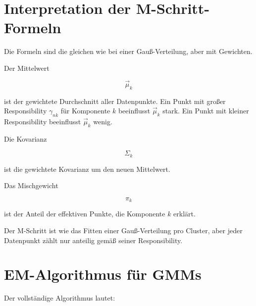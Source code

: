 \section{Interpretation der M-Schritt-Formeln}

Die Formeln sind die gleichen wie bei einer Gauß-Verteilung, aber mit Gewichten.

Der Mittelwert

\[
    \vec{\mu}_k
\]

ist der gewichtete Durchschnitt aller Datenpunkte.
Ein Punkt mit großer Responsibility \(\gamma_{nk}\) für Komponente \(k\) beeinflusst \(\vec{\mu}_k\) stark.
Ein Punkt mit kleiner Responsibility beeinflusst \(\vec{\mu}_k\) wenig.

Die Kovarianz

\[
    \Sigma_k
\]

ist die gewichtete Kovarianz um den neuen Mittelwert.

Das Mischgewicht

\[
    \pi_k
\]

ist der Anteil der effektiven Punkte, die Komponente \(k\) erklärt.

\begin{conceptbox}
Der M-Schritt ist wie das Fitten einer Gauß-Verteilung pro Cluster, aber jeder Datenpunkt zählt nur anteilig gemäß seiner Responsibility.
\end{conceptbox}

\section{EM-Algorithmus für GMMs}

Der vollständige Algorithmus lautet:

